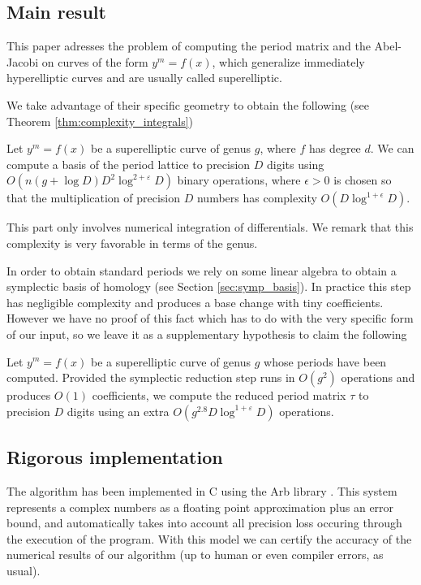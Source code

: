 \documentclass[main.tex]{subfiles}
\begin{document}
  \subsection{Main result}

  This paper adresses the problem of computing the period matrix and the
  Abel-Jacobi on curves of the form $y^m = f(x)$, which generalize immediately
  hyperelliptic curves and are usually called superelliptic.

  We take advantage of their specific geometry to obtain the following
  (see Theorem \ref{thm:complexity_integrals})
  \begin{thm}
      Let $y^m=f(x)$ be a superelliptic curve of genus $g$,
      where $f$ has degree $d$.
      We can compute a basis of the period lattice to precision
      $D$ digits using $O(n(g+\log D)D^2\log^{2+\varepsilon} D)$
      binary operations, where $\epsilon>0$ is chosen so that
      the multiplication of precision $D$ numbers has complexity
      $O(D\log^{1+\epsilon}D)$.
  \end{thm}

  This part only involves numerical integration of differentials. We remark
  that this complexity is very favorable in terms of the genus.

  In order
  to obtain standard periods we rely on some linear algebra to obtain a
  symplectic basis of homology (see Section \ref{sec:symp_basis}).
  In practice this step has negligible complexity
  and produces a base change with tiny coefficients. However we have no proof
  of this fact which has to do with the very specific form of our input,
  so we leave it as a supplementary hypothesis to claim the
  following
  \begin{thm}
      Let $y^m=f(x)$ be a superelliptic curve of genus $g$ whose periods
      have been computed.
      Provided the symplectic reduction
      step runs in $O(g^2)$ operations and produces $O(1)$ coefficients,
      we compute the reduced period matrix $τ$ to precision $D$
      digits using an extra $O(g^{2.8}D\log^{1+\varepsilon}D)$ operations.
  \end{thm}

  \subsection{Rigorous implementation}

  The algorithm has been implemented in C using the Arb library \cite{Johansson2013arb}.
  This system represents a complex numbers as a floating point approximation
  plus an error bound, and automatically
  takes into account all precision loss occuring through the
  execution of the program. With this model we can certify
  the accuracy of the numerical results of our algorithm (up to human or even
  compiler errors, as usual).
\end{document}
